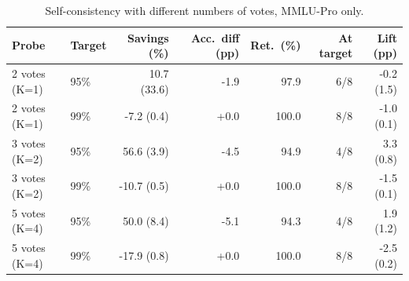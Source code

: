 \begin{table}[!htbp]
\centering\small
\caption{Self-consistency with different numbers of votes, MMLU-Pro only.}\label{tab:k_mmlu}
\begin{tabular}{llrrrrr}
\toprule
Probe & Target & Savings (\%) & Acc.\ diff (pp) & Ret.\ (\%) & At target & Lift (pp) \\
\midrule
2 votes (K=1) & 95\% & 10.7 (33.6) & -1.9 & 97.9 & 6/8 & -0.2 (1.5) \\
2 votes (K=1) & 99\% & -7.2 (0.4) & +0.0 & 100.0 & 8/8 & -1.0 (0.1) \\
3 votes (K=2) & 95\% & 56.6 (3.9) & -4.5 & 94.9 & 4/8 & 3.3 (0.8) \\
3 votes (K=2) & 99\% & -10.7 (0.5) & +0.0 & 100.0 & 8/8 & -1.5 (0.1) \\
5 votes (K=4) & 95\% & 50.0 (8.4) & -5.1 & 94.3 & 4/8 & 1.9 (1.2) \\
5 votes (K=4) & 99\% & -17.9 (0.8) & +0.0 & 100.0 & 8/8 & -2.5 (0.2) \\
\bottomrule
\end{tabular}
\end{table}
